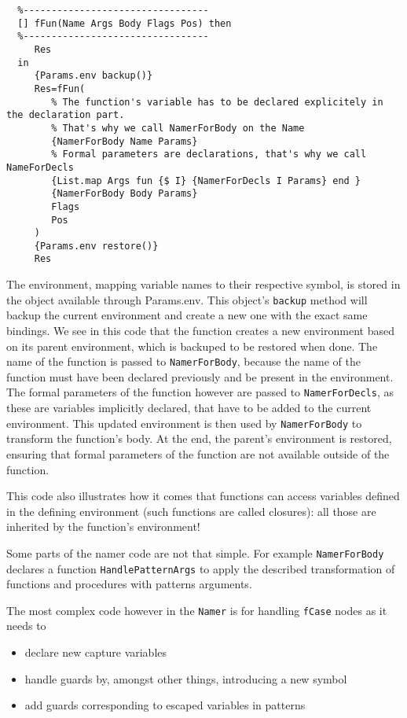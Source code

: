\documentclass[a4paper]{memoir}
\begin{document}
\begin{lstlisting}
  %---------------------------------
  [] fFun(Name Args Body Flags Pos) then
  %---------------------------------
     Res
  in
     {Params.env backup()} 
     Res=fFun(
        % The function's variable has to be declared explicitely in the declaration part.
        % That's why we call NamerForBody on the Name
        {NamerForBody Name Params}
        % Formal parameters are declarations, that's why we call NameForDecls
        {List.map Args fun {$ I} {NamerForDecls I Params} end }
        {NamerForBody Body Params}
        Flags
        Pos
     )
     {Params.env restore()}
     Res
\end{lstlisting}
The environment, mapping variable names to their respective symbol, is stored in the object available through Params.env. This object's \lstinline!backup! method will backup the current environment and create a new one with the exact same bindings.
We see in this code that the function creates a new environment based on its parent environment, which is backuped to be restored when done. The name of the function is passed to \lstinline!NamerForBody!, because the name of the function must have been declared previously and be present in the environment. 
The formal parameters of the function however are passed to \lstinline!NamerForDecls!, as these are variables implicitly declared, that have to be added to the current environment. This updated environment is then used by \lstinline!NamerForBody! to transform the function's body.
At the end, the parent's environment is restored, ensuring that formal parameters of the function are not available outside of the function.

This code also illustrates how it comes that functions can access variables defined in the defining environment (such functions are called closures): all those are inherited by the function's environment!

Some parts of the namer code are not that simple. For example \lstinline!NamerForBody! 
declares a function \lstinline!HandlePatternArgs!
to apply the described transformation of functions and procedures with patterns
arguments. 

The most complex code however in the \lstinline!Namer! is for handling \lstinline!fCase! nodes as it needs to 
\begin{itemize}
  \item declare new capture variables
  \item handle guards by, amongst other things, introducing a new symbol
  \item add guards corresponding to escaped variables in patterns
\end{itemize}
\end{document}
